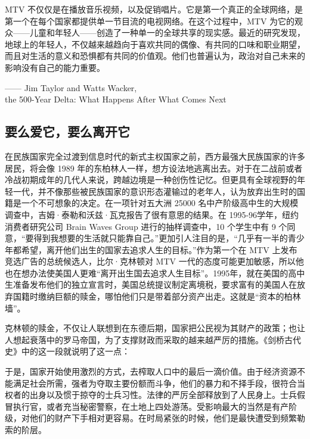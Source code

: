 \begin{tcolorbox}
MTV 不仅仅是在播放音乐视频，以及促销唱片。它是第一个真正的全球网络，是第一个在每个国家都提供单一节目流的电视网络。在这个过程中，MTV 为它的观众——儿童和年轻人——创造了一种单一的全球共享的现实感。最近的研究发现，地球上的年轻人，不仅越来越趋向于喜欢共同的偶像、有共同的口味和职业期望，而且对生活的意义和恐惧都有共同的价值观。他们也普遍认为，政治对自己未来的影响没有自己的能力重要。
\begin{flushright}
—— Jim Taylor and Watts Wacker, \\
the 500-Year Delta: What Happens After What Comes Next  
\end{flushright}
\end{tcolorbox}

\subsection{要么爱它，要么离开它}
在民族国家完全过渡到信息时代的新式主权国家之前，西方最强大民族国家的许多居民，将会像 1989 年的东柏林人一样，想方设法地逃离出去。对于在二战前或者冷战初期成年的几代人来说，跨越边境是一种创伤性记忆。但更具有全球视野的年轻一代，并不像那些被民族国家的意识形态灌输过的老年人，认为放弃出生时的国籍是一个不可想象的决定。在一项针对五大洲 25000 名中产阶级高中生的大规模调查中，吉姆·泰勒和沃兹·瓦克报告了很有意思的结果。在 1995-96学年，纽约消费者研究公司 Brain Waves Group 进行的抽样调查中，10 个学生中有 9 个同意，“要得到我想要的生活就只能靠自己。”更加引人注目的是，“几乎有一半的青少年都希望，离开他们出生的国家去追求人生的目标。”作为第一个在 MTV 上发布竞选广告的总统候选人，比尔·克林顿对 MTV 一代的态度可能更加敏感，所以他也在想办法使美国人更难“离开出生国去追求人生目标”。1995年，就在美国的高中生准备发布他们的独立宣言时，美国总统提议制定离境税，要求富有的美国人在放弃国籍时缴纳巨额的赎金，哪怕他们只是带着部分资产出走。这就是“资本的柏林墙”。

克林顿的赎金，不仅让人联想到在东德后期，国家把公民视为其财产的政策；也让人想起衰落中的罗马帝国，为了支撑财政而采取的越来越严厉的措施。《剑桥古代史》中的这一段就说明了这一点：


\begin{tcolorbox}
\kaishu 于是，国家开始使用激烈的方式，去榨取人口中的最后一滴价值。由于经济资源不能满足社会所需，强者为夺取主要份额而斗争，他们的暴力和不择手段，很符合当权者的出身以及惯于掠夺的士兵习性。法律的严厉全部释放到了人民身上。士兵假冒执行官，或者充当秘密警察，在土地上四处游荡。受影响最大的当然是有产阶级，对他们的财产下手相对更容易。在时局紧张的时候，他们是最快遭受到频繁勒索的阶层。
\end{tcolorbox}

